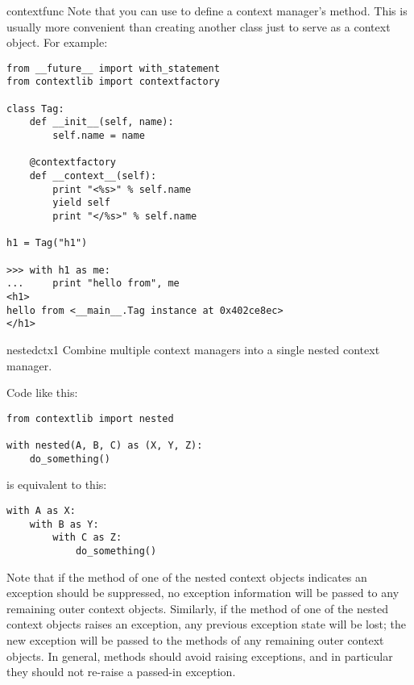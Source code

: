 \begin{funcdesc}{context}{func}
Note that you can use  to define a context
manager's  method.  This is usually more
convenient than creating another class just to serve as a context
object. For example:

\begin{verbatim}
from __future__ import with_statement
from contextlib import contextfactory

class Tag:
    def __init__(self, name):
        self.name = name
        
    @contextfactory
    def __context__(self):
        print "<%s>" % self.name
        yield self
        print "</%s>" % self.name
        
h1 = Tag("h1")

>>> with h1 as me:
...     print "hello from", me
<h1>
hello from <__main__.Tag instance at 0x402ce8ec>
</h1>
\end{verbatim}
\end{funcdesc}

\begin{funcdesc}{nested}{ctx1}
Combine multiple context managers into a single nested context manager.

Code like this:

\begin{verbatim}
from contextlib import nested

with nested(A, B, C) as (X, Y, Z):
    do_something()
\end{verbatim}

is equivalent to this:

\begin{verbatim}
with A as X:
    with B as Y:
        with C as Z:
            do_something()
\end{verbatim}

Note that if the  method of one of the nested
context objects indicates an exception should be suppressed, no
exception information will be passed to any remaining outer context
objects. Similarly, if the  method of one of the
nested context objects raises an exception, any previous exception
state will be lost; the new exception will be passed to the
 methods of any remaining outer context objects.
In general,  methods should avoid raising
exceptions, and in particular they should not re-raise a
passed-in exception.
\end{funcdesc}

